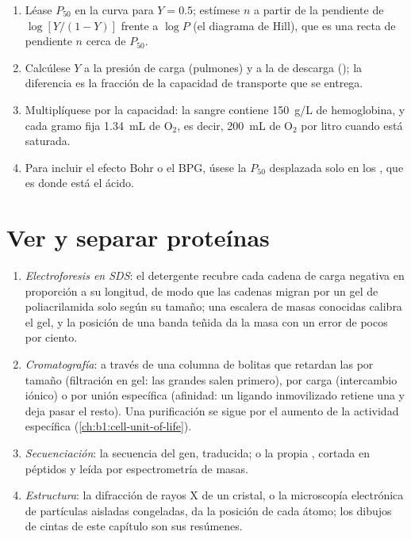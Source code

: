 \begin{method}\label{met:b1:proteins:hill}
\begin{enumerate}
  \item Léase $P_{50}$ en la curva para $Y = 0.5$; estímese $n$ a partir de
        la pendiente de $\log[Y/(1-Y)]$ frente a $\log P$ (el diagrama de
        Hill), que es una recta de pendiente $n$ cerca de $P_{50}$.
  \item Calcúlese $Y$ a la presión de carga (pulmones) y a la de descarga
        (); la diferencia es la fracción de la capacidad de
        transporte que se entrega.
  \item Multiplíquese por la capacidad: la sangre contiene \qty{150}{g/L}
        de hemoglobina, y cada gramo fija \qty{1.34}{mL} de
        $\mathrm{O_2}$, es decir, \qty{200}{mL} de $\mathrm{O_2}$ por litro
        cuando está saturada.
  \item Para incluir el efecto Bohr o el BPG, úsese la $P_{50}$ desplazada
        solo en los , que es donde está el ácido.
\end{enumerate}
\end{method}

\section{Ver y separar proteínas}

\begin{method}\label{met:b1:proteins:methods}
\begin{enumerate}
  \item \emph{Electroforesis en SDS}: el detergente recubre cada cadena de
        carga negativa en proporción a su longitud, de modo que las cadenas
        migran por un gel de poliacrilamida solo según su tamaño; una
        escalera de masas conocidas calibra el gel, y la posición de una
        banda teñida da la masa con un error de pocos por ciento.
  \item \emph{Cromatografía}: a través de una columna de bolitas que
        retardan las  por tamaño (filtración en gel: las grandes
        salen primero), por carga (intercambio iónico) o por unión
        específica (afinidad: un ligando inmovilizado retiene una 
        y deja pasar el resto). Una purificación se sigue por el aumento de
        la actividad específica (\cref{ch:b1:cell-unit-of-life}).
  \item \emph{Secuenciación}: la secuencia del gen, traducida; o la propia
        , cortada en péptidos y leída por espectrometría de masas.
  \item \emph{Estructura}: la difracción de rayos X de un cristal, o la
        microscopía electrónica de partículas aisladas congeladas, da la
        posición de cada átomo; los dibujos de cintas de este capítulo son
        sus resúmenes.
\end{enumerate}
\end{method}

